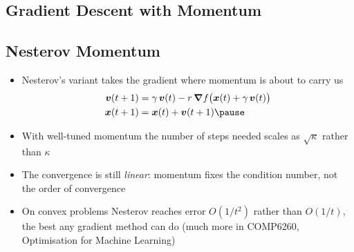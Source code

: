 
\begin{slide}
\section{Gradient Descent with Momentum}

\pb\pause{}
\begin{center}
  \pause
\end{center}
\end{slide}


\begin{slide}
\section[-2]{Nesterov Momentum}

\begin{PauseHighLight}\squeeze
  \begin{itemize}
  \item Nesterov's variant takes the gradient where momentum is about to
    carry us
    \begin{align*}
      \bm{v}(t+1) &= \gamma\,\bm{v}(t) - r\,\grad f\bigl(\bm{x}(t)+\gamma\,\bm{v}(t)\bigr)\\
      \bm{x}(t+1) &= \bm{x}(t) + \bm{v}(t+1)\pause
    \end{align*}
  \item With well-tuned momentum the number of steps needed scales as
    $\sqrt{\kappa}$ rather than $\kappa$\pause
  \item The convergence is still \emph{linear}: momentum fixes the
    condition number, not the order of convergence\pause
  \item On convex problems Nesterov reaches error $O(1/t^2)$ rather
    than $O(1/t)$, the best any gradient method can do (much more in
    COMP6260, Optimisation for Machine Learning)\pause
  \end{itemize}
\end{PauseHighLight}
\end{slide}


